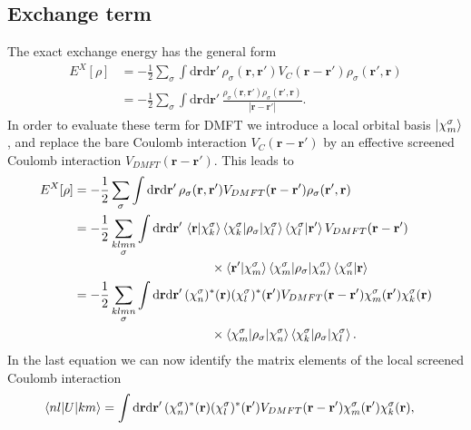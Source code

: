 \documentclass[12pt,a4paper]{scrartcl}
\numberwithin{equation}{section}
\renewcommand{\vec}{\mathbf}
\begin{document}
\subsection{Exchange term}
The exact exchange energy has the general form
\begin{align}
E^X[\rho]
%
&= -\frac{1}{2}\sum_{\sigma} \int \mathrm{d}\vec{r}\mathrm{d}\vec{r}' \, 
\rho_{\sigma}(\vec{r},\vec{r}') V_C(\vec{r}-\vec{r}') \rho_{\sigma}(\vec{r}',\vec{r}) \\
%
&= -\frac{1}{2}\sum_{\sigma} \int \mathrm{d}\vec{r}\mathrm{d}\vec{r}' \,
\frac{\rho_{\sigma}(\vec{r},\vec{r}') \rho_{\sigma}(\vec{r}',\vec{r}) }{|\vec{r}-\vec{r}'|}.
\end{align}
In order to evaluate these term for DMFT we introduce a local orbital basis  $\ket{\chi^{\sigma}_m}$, 
and replace the bare Coulomb interaction $V_C(\vec{r}-\vec{r}')$ 
by an effective screened Coulomb interaction $V_{DMFT}(\vec{r}-\vec{r}')$.
This leads to 
\begin{align}
E^X[\rho]
&= -\frac{1}{2}\sum_{\sigma} \int \mathrm{d}\vec{r}\mathrm{d}\vec{r}' \, 
\rho_{\sigma}(\vec{r},\vec{r}') V_{DMFT}(\vec{r}-\vec{r}') \rho_{\sigma}(\vec{r}',\vec{r}) \\
%
&= -\frac{1}{2} \sum_{\substack{klmn\\\sigma}} \int \mathrm{d}\vec{r}\mathrm{d}\vec{r}' \, 
\braket{\vec{r} | \chi^{\sigma}_k }\braket{\chi^{\sigma}_k | \rho_{\sigma} | \chi^{\sigma}_l } \braket{\chi^{\sigma}_l | \vec{r}'}  V_{DMFT}(\vec{r}-\vec{r}') \nonumber\\
& \hspace{3.8cm} \times 
\braket{\vec{r}' | \chi^{\sigma}_m }\braket{\chi^{\sigma}_m | \rho_{\sigma} | \chi^{\sigma}_n } \braket{\chi^{\sigma}_n | \vec{r}} \\
% 
&= -\frac{1}{2} \sum_{\substack{klmn\\\sigma}} \int \mathrm{d}\vec{r}\mathrm{d}\vec{r}' \, 
(\chi^{\sigma}_n)^*(\vec{r}) (\chi^{\sigma}_l)^*(\vec{r}')  
V_{DMFT}(\vec{r}-\vec{r}') 
\chi^{\sigma}_m (\vec{r}') \chi^{\sigma}_k (\vec{r}) \nonumber\\
& \hspace{3.8cm} \times 
\braket{\chi^{\sigma}_m | \rho_{\sigma} | \chi^{\sigma}_n }
\braket{\chi^{\sigma}_k | \rho_{\sigma} | \chi^{\sigma}_l }.
\end{align}
In the last equation we can now identify the matrix elements of the local screened Coulomb
interaction
\begin{align}
\braket{nl|U|km} 
&= \int \mathrm{d}\vec{r}\mathrm{d}\vec{r}' \, 
(\chi^{\sigma}_n)^*(\vec{r}) (\chi^{\sigma}_l)^*(\vec{r}')  
V_{DMFT}(\vec{r}-\vec{r}') 
\chi^{\sigma}_m (\vec{r}') \chi^{\sigma}_k (\vec{r}),
\end{align}
\end{document}
